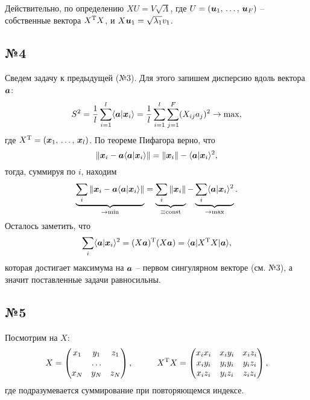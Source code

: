 Действительно, по определению $X U = V \sqrt{\Lambda}$, где $U = \left(\mbox{\boldmath $u$}_1,\, \ldots,\, \mbox{\boldmath $u$}_F\right)$ -- собственные вектора $X^{\text{T}} X$, и $X \mbox{\boldmath $u$}_1 = \sqrt{\lambda_1} v_1$. 




\subsection*{№4}


Сведем задачу к предыдущей (№3). Для этого запишем дисперсию вдоль вектора $\mbox{\boldmath $a$}$:
\begin{equation*}
    S^2 = \frac{1}{l} \sum_{i=1}^{l} \langle \mbox{\boldmath $a$} | \mbox{\boldmath $x$}_i\rangle = \frac{1}{l} \sum_{i=1}^{l}  \sum_{j=1}^{F} (X_{ij} a_j)^2 \to \max,
\end{equation*}
где $X^{\text{T}} = \left(\mbox{\boldmath $x$}_1,\, \ldots,\, \mbox{\boldmath $x$}_l\right)$. По теореме Пифагора верно, что
\begin{equation*}
    \|\mbox{\boldmath $x$}_i - \mbox{\boldmath $a$} \langle \mbox{\boldmath $a$} | \mbox{\boldmath $x$}_i\rangle\| = \|\mbox{\boldmath $x$}_i\| - \langle \mbox{\boldmath $a$} | \mbox{\boldmath $x$}_i\rangle^2,
\end{equation*}
тогда, суммируя по $i$, находим
\begin{equation*}
    \underbrace{\sum_i \|\mbox{\boldmath $x$}_i - \mbox{\boldmath $a$} \langle \mbox{\boldmath $a$} | \mbox{\boldmath $x$}_i\rangle\|}_{\to \min} 
    = 
    \underbrace{\sum_i  \|\mbox{\boldmath $x$}_i\|}_{\equiv \textnormal{const}}
     -
    \underbrace{\sum_i  \langle \mbox{\boldmath $a$} | \mbox{\boldmath $x$}_i\rangle^2}_{\to \max}.
\end{equation*}
Осталось заметить, что
\begin{equation*}
    \sum_i \langle \mbox{\boldmath $a$} | \mbox{\boldmath $x$}_i\rangle^2 = (X \mbox{\boldmath $a$})^{\text{T}} (X \mbox{\boldmath $a$}) = 
    \langle \mbox{\boldmath $a$}| X^{\text{T}} X | \mbox{\boldmath $a$} \rangle,
\end{equation*}
которая достигает максимума на $\mbox{\boldmath $a$}$ -- первом сингулярном векторе (см. №3), а значит поставленные задачи равносильны.





\subsection*{№5}


Посмотрим на $X$:
\begin{equation*}
    X = \begin{pmatrix}
        x_1 & y_1 & z_1 \\
         & \ldots &  \\
        x_N & y_N & z_N \\
    \end{pmatrix},
    \hspace{10 mm} 
    X\T X = 
    \begin{pmatrix}
        x_i x_i & x_i y_i & x_i z_i \\
        x_i y_i & y_i y_i & y_i z_i \\
        x_i z_i & y_i z_i & z_i z_i \\
    \end{pmatrix},
\end{equation*}
где подразумевается суммирование при повторяющемся индексе. 

